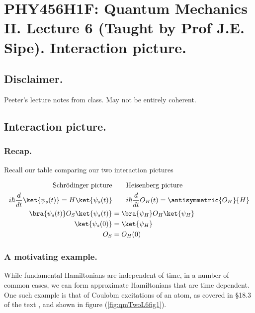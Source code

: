 
%

\chapter{PHY456H1F: Quantum Mechanics II.  Lecture 6 (Taught by Prof J.E. Sipe).  Interaction picture.}
\label{chap:qmTwoL6}
{}
\date{Sept 26, 2011}

\beginArtWithToc

\section{Disclaimer.}

Peeter's lecture notes from class.  May not be entirely coherent.

\section{Interaction picture.}
\subsection{Recap.}

Recall our table comparing our two interaction pictures

\begin{align*}
\text{Schr\"{o}dinger picture} &\qquad \text{Heisenberg picture} \\
i \hbar \frac{d}{dt} \ket{\psi_s(t)} = H \ket{\psi_s(t)} &\qquad i \hbar \frac{d}{dt} O_H(t) = \antisymmetric{O_H}{H} \\
\bra{\psi_s(t)} O_S \ket{\psi_s(t)} &= \bra{\psi_H} O_H \ket{\psi_H} \\
\ket{\psi_s(0)} &= \ket{\psi_H} \\
O_S &= O_H(0)
\end{align*}

\subsection{A motivating example.}

While fundamental Hamiltonians are independent of time, in a number of common cases, we can form approximate Hamiltonians that are time dependent.  One such example is that of Coulobm excitations of an atom, as covered in \S 18.3 of the text \cite{desai2009quantum}, and shown in figure (\ref{fig:qmTwoL6fig1}).

